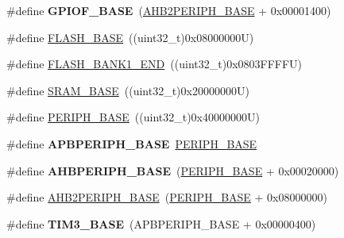 \begin{DoxyCompactItemize}
\item 
\mbox{\label{group___peripheral__memory__map_ga7f9a3f4223a1a784af464a114978d26e}} 
\#define {\bfseries G\+P\+I\+O\+F\+\_\+\+B\+A\+SE}~(\hyperlink{group___peripheral__memory__map_gaeedaa71d22a1948492365e2cd26cfd46}{A\+H\+B2\+P\+E\+R\+I\+P\+H\+\_\+\+B\+A\+SE} + 0x00001400)
\item 
\#define \hyperlink{group___peripheral__memory__map_ga23a9099a5f8fc9c6e253c0eecb2be8db}{F\+L\+A\+S\+H\+\_\+\+B\+A\+SE}~((uint32\+\_\+t)0x08000000\+U)
\item 
\#define \hyperlink{group___peripheral__memory__map_ga443a2786535d83e32dfdc2b29e379332}{F\+L\+A\+S\+H\+\_\+\+B\+A\+N\+K1\+\_\+\+E\+ND}~((uint32\+\_\+t)0x0803\+F\+F\+F\+F\+U)
\item 
\#define \hyperlink{group___peripheral__memory__map_ga05e8f3d2e5868754a7cd88614955aecc}{S\+R\+A\+M\+\_\+\+B\+A\+SE}~((uint32\+\_\+t)0x20000000\+U)
\item 
\#define \hyperlink{group___peripheral__memory__map_ga9171f49478fa86d932f89e78e73b88b0}{P\+E\+R\+I\+P\+H\+\_\+\+B\+A\+SE}~((uint32\+\_\+t)0x40000000\+U)
\item 
\mbox{\label{group___peripheral__memory__map_gac85f31889eb6a3f651b563bbc7131f91}} 
\#define {\bfseries A\+P\+B\+P\+E\+R\+I\+P\+H\+\_\+\+B\+A\+SE}~\hyperlink{group___peripheral__memory__map_ga9171f49478fa86d932f89e78e73b88b0}{P\+E\+R\+I\+P\+H\+\_\+\+B\+A\+SE}
\item 
\mbox{\label{group___peripheral__memory__map_ga92eb5d49730765d2abd0f5b09548f9f5}} 
\#define {\bfseries A\+H\+B\+P\+E\+R\+I\+P\+H\+\_\+\+B\+A\+SE}~(\hyperlink{group___peripheral__memory__map_ga9171f49478fa86d932f89e78e73b88b0}{P\+E\+R\+I\+P\+H\+\_\+\+B\+A\+SE} + 0x00020000)
\item 
\#define \hyperlink{group___peripheral__memory__map_gaeedaa71d22a1948492365e2cd26cfd46}{A\+H\+B2\+P\+E\+R\+I\+P\+H\+\_\+\+B\+A\+SE}~(\hyperlink{group___peripheral__memory__map_ga9171f49478fa86d932f89e78e73b88b0}{P\+E\+R\+I\+P\+H\+\_\+\+B\+A\+SE} + 0x08000000)
\item 
\mbox{\label{group___peripheral__memory__map_gaf0c34a518f87e1e505cd2332e989564a}} 
\#define {\bfseries T\+I\+M3\+\_\+\+B\+A\+SE}~(A\+P\+B\+P\+E\+R\+I\+P\+H\+\_\+\+B\+A\+SE + 0x00000400)

\end{DoxyCompactItemize}
